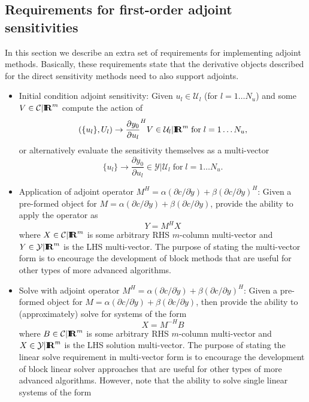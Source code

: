 \documentclass[pdf,ps2pdf,11pt]{SANDreport}
\begin{document}
\subsection{Requirements for first-order adjoint sensitivities}

In this section we describe an extra set of requirements for implementing
adjoint methods.  Basically, these requirements state that the derivative
objects described for the direct sensitivity methods need to also support
adjoints.

\begin{itemize}

{}\item Initial condition adjoint sensitivity: Given $u_l\in\mathcal{U}_l$ (for
$l=1\ldots{}N_u$) and some $V\in\mathcal{C}|\mbox{\textbf{I}}\hspace{-0.6ex}\mbox{\textbf{R}}^m$ compute the action of
\[
(\{u_l\},U_l) {}\rightarrow \frac{\partial y_0}{\partial u_l}^H V \in \mathcal{U}_l|\mbox{\textbf{I}}\hspace{-0.6ex}\mbox{\textbf{R}}^m
\; \mbox{for} \; l = 1 {}\ldots N_u,
\]
or alternatively evaluate the sensitivity themselves as a multi-vector
\[
\{u_l\} {}\rightarrow \frac{\partial y_0}{\partial u_l} \in \mathcal{Y}|\mathcal{U}_l
\; \mbox{for} \; l = 1 {}\ldots N_u.
\]
%
{}\item Application of adjoint operator $M^H = {}\alpha ({}\partial c /
{}\partial {}\dot{y}) + {}\beta ({}\partial c / {}\partial y)^H$: Given a
pre-formed object for $M = {}\alpha ({}\partial c / {}\partial {}\dot{y}) +
{}\beta ({}\partial c / {}\partial y)$, provide the ability to apply the
operator as
\[
Y = M^H X
\]
where $X\in\mathcal{C}|\mbox{\textbf{I}}\hspace{-0.6ex}\mbox{\textbf{R}}^m$ is some arbitrary RHS $m$-column multi-vector
and $Y\in\mathcal{Y}|\mbox{\textbf{I}}\hspace{-0.6ex}\mbox{\textbf{R}}^m$ is the LHS multi-vector.  The purpose of
stating the multi-vector form is to encourage the development of block methods
that are useful for other types of more advanced algorithms.
%
{}\item Solve with adjoint operator $M^H = {}\alpha ({}\partial c / {}\partial
{}\dot{y}) + {}\beta ({}\partial c / {}\partial y)^H$: Given a pre-formed
object for $M = {}\alpha ({}\partial c / {}\partial {}\dot{y}) + {}\beta
({}\partial c / {}\partial y)$, then provide the ability to (approximately)
solve for systems of the form
\[
X = M^{-H} B
\]
where $B\in\mathcal{C}|\mbox{\textbf{I}}\hspace{-0.6ex}\mbox{\textbf{R}}^m$ is some arbitrary RHS $m$-column multi-vector
and $X\in\mathcal{Y}|\mbox{\textbf{I}}\hspace{-0.6ex}\mbox{\textbf{R}}^m$ is the LHS solution multi-vector.  The purpose of
stating the linear solve requirement in multi-vector form is to encourage the
development of block linear solver approaches that are useful for other types
of more advanced algorithms.  However, note that the ability to solve single
linear systems of the form

\end{itemize}
\end{document}
